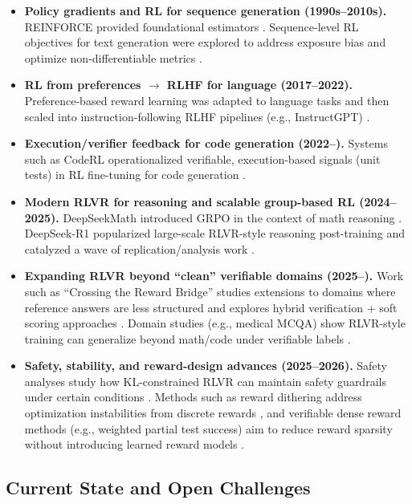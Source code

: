 \documentclass[sigconf]{acmart}
\begin{document}
\begin{itemize}
  \item \textbf{Policy gradients and RL for sequence generation (1990s--2010s).}
  REINFORCE provided foundational estimators \cite{williams1992reinforce}.
  Sequence-level RL objectives for text generation were explored to address exposure bias and optimize non-differentiable metrics \cite{ranzato2016sequence,paulus2018summarization}.
  \item \textbf{RL from preferences $\rightarrow$ RLHF for language (2017--2022).}
  Preference-based reward learning \cite{christiano2017preferences} was adapted to language tasks \cite{ziegler2019finetuning,stiennon2020summarize} and then scaled into instruction-following RLHF pipelines (e.g., InstructGPT) \cite{ouyang2022instructgpt}.
  \item \textbf{Execution/verifier feedback for code generation (2022--).}
  Systems such as CodeRL operationalized verifiable, execution-based signals (unit tests) in RL fine-tuning for code generation \cite{le2022coderl}.
  \item \textbf{Modern RLVR for reasoning and scalable group-based RL (2024--2025).}
  DeepSeekMath introduced GRPO in the context of math reasoning \cite{deepseekai2024deepseekmath}.
  DeepSeek-R1 popularized large-scale RLVR-style reasoning post-training and catalyzed a wave of replication/analysis work \cite{guo2025deepseekr1,wen2025rlvr,mroueh2025grpo}.
  \item \textbf{Expanding RLVR beyond ``clean'' verifiable domains (2025--).}
  Work such as ``Crossing the Reward Bridge'' studies extensions to domains where reference answers are less structured and explores hybrid verification + soft scoring approaches \cite{su2025crossingrewardbridge}.
  Domain studies (e.g., medical MCQA) show RLVR-style training can generalize beyond math/code under verifiable labels \cite{zhang2025medrlvr}.
  \item \textbf{Safety, stability, and reward-design advances (2025--2026).}
  Safety analyses study how KL-constrained RLVR can maintain safety guardrails under certain conditions \cite{cho2025safetycapability}.
  Methods such as reward dithering address optimization instabilities from discrete rewards \cite{wei2025redit}, and verifiable dense reward methods (e.g., weighted partial test success) aim to reduce reward sparsity without introducing learned reward models \cite{wang2026verpo}.
\end{itemize}

\subsection{Current State and Open Challenges}
\end{document}
